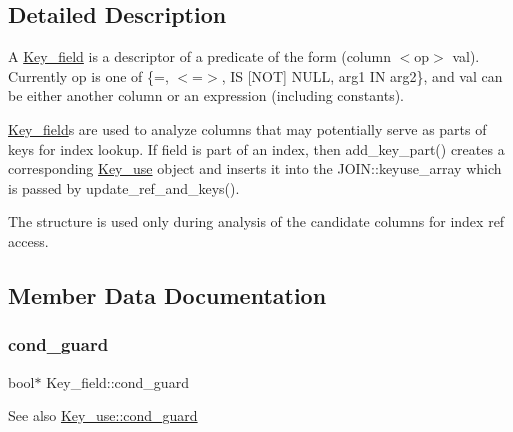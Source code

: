 \subsection{Detailed Description}
A \mbox{\hyperlink{structKey__field}{Key\+\_\+field}} is a descriptor of a predicate of the form (column $<$op$>$ val). Currently \textquotesingle{}op\textquotesingle{} is one of \{\textquotesingle{}=\textquotesingle{}, \textquotesingle{}$<$=$>$\textquotesingle{}, \textquotesingle{}IS \mbox{[}N\+OT\mbox{]} N\+U\+LL\textquotesingle{}, \textquotesingle{}arg1 IN arg2\textquotesingle{}\}, and \textquotesingle{}val\textquotesingle{} can be either another column or an expression (including constants).

\mbox{\hyperlink{structKey__field}{Key\+\_\+field}}\textquotesingle{}s are used to analyze columns that may potentially serve as parts of keys for index lookup. If \textquotesingle{}field\textquotesingle{} is part of an index, then add\+\_\+key\+\_\+part() creates a corresponding \mbox{\hyperlink{classKey__use}{Key\+\_\+use}} object and inserts it into the J\+O\+I\+N\+::keyuse\+\_\+array which is passed by update\+\_\+ref\+\_\+and\+\_\+keys().

The structure is used only during analysis of the candidate columns for index \textquotesingle{}ref\textquotesingle{} access. 

\subsection{Member Data Documentation}
\mbox{\label{structKey__field_a16b72e1543518a93bca63b15f6274598}} 
\subsubsection{\texorpdfstring{cond\+\_\+guard}{cond\_guard}}
{\footnotesize\ttfamily bool$\ast$ Key\+\_\+field\+::cond\+\_\+guard}

\begin{DoxySeeAlso}{See also}
\mbox{\hyperlink{classKey__use_ae462d9f6aefe49c1907600a9921b02a6}{Key\+\_\+use\+::cond\+\_\+guard}} 
\end{DoxySeeAlso}
\mbox{\label{structKey__field_ad15eb695b878f6436d97bcc8f37fad20}} 
